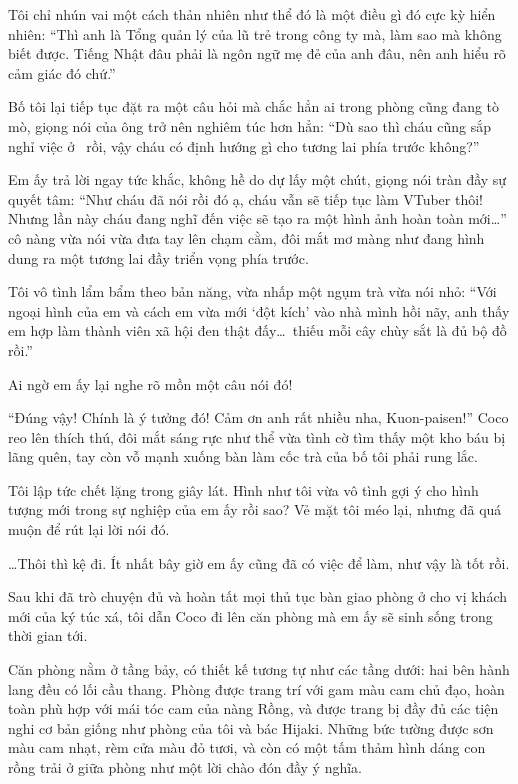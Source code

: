 \documentclass[../main.tex]{subfiles}
\begin{document}
Tôi chỉ nhún vai một cách thản nhiên như thể đó là một điều gì đó cực kỳ hiển nhiên: ``Thì anh là Tổng quản lý của lũ trẻ trong công ty mà, làm sao mà không biết được. Tiếng Nhật đâu phải là ngôn ngữ mẹ đẻ của anh đâu, nên anh hiểu rõ cảm giác đó chứ.''

Bố tôi lại tiếp tục đặt ra một câu hỏi mà chắc hẳn ai trong phòng cũng đang tò mò, giọng nói của ông trở nên nghiêm túc hơn hẳn: ``Dù sao thì cháu cũng sắp nghỉ việc ở \hll\ rồi, vậy cháu có định hướng gì cho tương lai phía trước không?''

Em ấy trả lời ngay tức khắc, không hề do dự lấy một chút, giọng nói tràn đầy sự quyết tâm: ``Như cháu đã nói rồi đó ạ, cháu vẫn sẽ tiếp tục làm VTuber thôi! Nhưng lần này cháu đang nghĩ đến việc sẽ tạo ra một hình ảnh hoàn toàn mới\dots'' cô nàng vừa nói vừa đưa tay lên chạm cằm, đôi mắt mơ màng như đang hình dung ra một tương lai đầy triển vọng phía trước.

Tôi vô tình lẩm bẩm theo bản năng, vừa nhấp một ngụm trà vừa nói nhỏ: ``Với ngoại hình của em và cách em vừa mới `đột kích' vào nhà mình hồi nãy, anh thấy em hợp làm thành viên xã hội đen thật đấy\dots\ thiếu mỗi cây chùy sắt là đủ bộ đồ rồi.''

Ai ngờ em ấy lại nghe rõ mồn một câu nói đó!

``Đúng vậy! Chính là ý tưởng đó! Cảm ơn anh rất nhiều nha, Kuon-paisen!'' Coco reo lên thích thú, đôi mắt sáng rực như thể vừa tình cờ tìm thấy một kho báu bị lãng quên, tay còn vỗ mạnh xuống bàn làm cốc trà của bố tôi phải rung lắc.

Tôi lập tức chết lặng trong giây lát. Hình như tôi vừa vô tình gợi ý cho hình tượng mới trong sự nghiệp của em ấy rồi sao? Vẻ mặt tôi méo lại, nhưng đã quá muộn để rút lại lời nói đó.

\dots Thôi thì kệ đi. Ít nhất bây giờ em ấy cũng đã có việc để làm, như vậy là tốt rồi.

\ct

Sau khi đã trò chuyện đủ và hoàn tất mọi thủ tục bàn giao phòng ở cho vị khách mới của ký túc xá, tôi dẫn Coco đi lên căn phòng mà em ấy sẽ sinh sống trong thời gian tới.

Căn phòng nằm ở tầng bảy, có thiết kế tương tự như các tầng dưới: hai bên hành lang đều có lối cầu thang. Phòng được trang trí với gam màu cam chủ đạo, hoàn toàn phù hợp với mái tóc cam của nàng Rồng, và được trang bị đầy đủ các tiện nghi cơ bản giống như phòng của tôi và bác Hijaki. Những bức tường được sơn màu cam nhạt, rèm cửa màu đỏ tươi, và còn có một tấm thảm hình dáng con rồng trải ở giữa phòng như một lời chào đón đầy ý nghĩa.
\end{document}
